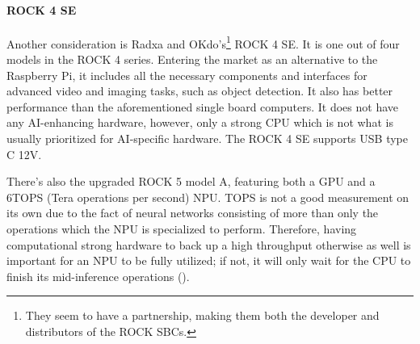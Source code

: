 \paragraph{ROCK 4 SE}
Another consideration is Radxa and OKdo's\footnote{They seem to have a partnership, making them both the developer and distributors of the ROCK SBCs.} ROCK 4 SE. It is one out of four models in the ROCK 4 series. Entering the market as an alternative to the Raspberry Pi, it includes all the necessary components and interfaces for advanced video and imaging tasks, such as object detection. It also has better performance than the aforementioned single board computers. It does not have any AI-enhancing hardware, however, only a strong CPU which is not what is usually prioritized for AI-specific hardware. The ROCK 4 SE supports USB type C 12V.

There's also the upgraded ROCK 5 model A, featuring both a GPU and a 6TOPS (Tera operations per second) NPU. TOPS is not a good measurement on its own due to the fact of neural networks consisting of more than only the operations which the NPU is specialized to perform. Therefore, having computational strong hardware to back up a high throughput otherwise as well is important for an NPU to be fully utilized; if not, it will only wait for the CPU to finish its mid-inference operations (\cite{ai2021TOPS}).

